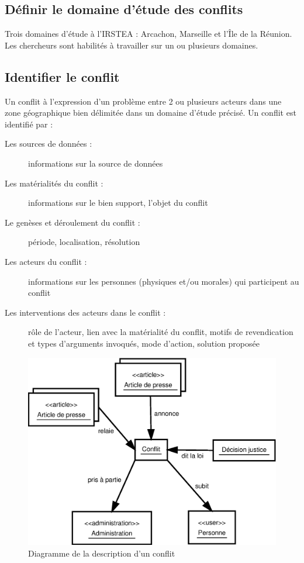 \documentclass[12pt,a4paper]{article}
\begin{document}
\subsection{Définir le domaine d'étude des conflits}
Trois domaines d'étude à l'IRSTEA : Arcachon, Marseille et l'Île de la Réunion. 
Les chercheurs sont habilités à travailler sur un ou plusieurs domaines.

\subsection{Identifier le conflit}
Un conflit à l'expression d'un problème entre 2 ou plusieurs acteurs dans une zone géographique bien délimitée dans un domaine d'étude précisé. \newline 
Un conflit est identifié par :
\begin{description}
\item[Les sources de données :] informations sur la source de données
\item[Les matérialités du conflit :] informations sur le bien support, l’objet du conflit
\item[Le genèses et déroulement du conflit :] période, localisation, résolution 
\item[Les acteurs du conflit :] informations sur les personnes (physiques et/ou morales) qui participent au conflit
\item[Les interventions des acteurs dans le conflit :] rôle de l’acteur, lien avec la matérialité du conflit, motifs de revendication et types d’arguments invoqués, mode d’action, solution proposée \newline \newline
\end{description}

\begin{figure}[!ht]
\centering
\includegraphics[width=\textwidth]{Image/ExplicationConflit.eps}
\caption{Diagramme de la description d'un conflit}
\end{figure}
\end{document}
